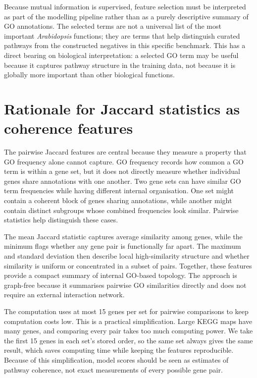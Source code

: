 \documentclass[12pt,letterpaper,oneside,openany]{book}
\begin{document}
Because mutual information is supervised, feature selection must be interpreted as part of the modelling pipeline rather than as a purely descriptive summary of GO annotations. The selected terms are not a universal list of the most important \textit{Arabidopsis} functions; they are terms that help distinguish curated pathways from the constructed negatives in this specific benchmark. This has a direct bearing on biological interpretation: a selected GO term may be useful because it captures pathway structure in the training data, not because it is globally more important than other biological functions.

\section{Rationale for Jaccard statistics as coherence features}
\label{sec:methods_jaccard_rationale}

The pairwise Jaccard features are central because they measure a property that GO frequency alone cannot capture. GO frequency records how common a GO term is within a gene set, but it does not directly measure whether individual genes share annotations with one another. Two gene sets can have similar GO term frequencies while having different internal organisation. One set might contain a coherent block of genes sharing annotations, while another might contain distinct subgroups whose combined frequencies look similar. Pairwise statistics help distinguish these cases.

The mean Jaccard statistic captures average similarity among genes, while the minimum flags whether any gene pair is functionally far apart. The maximum and standard deviation then describe local high-similarity structure and whether similarity is uniform or concentrated in a subset of pairs. Together, these features provide a compact summary of internal GO-based topology. The approach is graph-free because it summarises pairwise GO similarities directly and does not require an external interaction network.

The computation uses at most 15 genes per set for pairwise comparisons to keep computation costs low. This is a practical simplification. Large KEGG maps have many genes, and comparing every pair takes too much computing power. We take the first 15 genes in each set's stored order, so the same set always gives the same result, which saves computing time while keeping the features reproducible. Because of this simplification, model scores should be seen as estimates of pathway coherence, not exact measurements of every possible gene pair.
\end{document}
